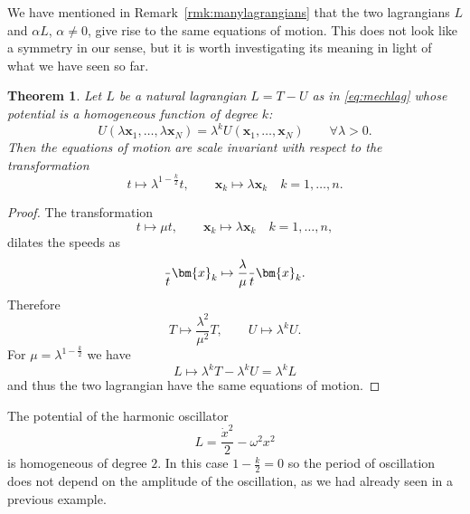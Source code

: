 \documentclass[english,fontsize=11pt,paper=a5,oneside]{scrbook}
\newcommand{\bx}{\bm{x}}
\let\d\relax
\DeclareMathOperator{\d}{d}
\newtheorem{theorem}{Theorem}[chapter]
\theoremstyle{definition}
\newenvironment{example}
  {\pushQED{\qed}\renewcommand{\qedsymbol}{$\lozenge$}\examplex}
  {\popQED\endexamplex}
\begin{document}
We have mentioned in Remark~\ref{rmk:manylagrangians} that the two lagrangians $L$ and $\alpha L$, $\alpha\neq0$, give rise to the same equations of motion.
This does not look like a symmetry in our sense, but it is worth investigating its meaning in light of what we have seen so far.

\begin{theorem}
    Let $L$ be a natural lagrangian $L=T-U$ as in \eqref{eq:mechlag} whose potential is a homogeneous function of degree $k$:
    \begin{equation}
        U(\lambda\bx_1, \ldots, \lambda\bx_N) = \lambda^k U(\bx_1, \ldots, \bx_N)
        \qquad\forall \lambda>0.
    \end{equation}
    Then the equations of motion are scale invariant with respect to the transformation
    \begin{equation}
        t \mapsto \lambda^{1-\frac{k}2} t, \qquad
        \bx_k \mapsto \lambda\bx_k \quad k=1,\ldots,n.
    \end{equation}
\end{theorem}
\begin{proof}
    The transformation
    \begin{equation}
        t \mapsto \mu t, \qquad
        \bx_k \mapsto \lambda\bx_k \quad k=1,\ldots,n,
    \end{equation}
    dilates the speeds as
    \begin{equation}
        \frac{\d}{\d t} \bx_k \mapsto \frac{\lambda}{\mu} \frac{\d}{\d t}\bx_k.
    \end{equation}
    Therefore
    \begin{equation}
        T \mapsto \frac{\lambda^2}{\mu^2} T, \qquad U \mapsto \lambda^k U.
    \end{equation}
    For $\mu = \lambda^{1-\frac{k}2}$ we have
    \begin{equation}
        L \mapsto \lambda^k T - \lambda^k U = \lambda^k L
    \end{equation}
    and thus the two lagrangian have the same equations of motion.
\end{proof}

\begin{example}[Harmonic oscillator]
    The potential of the harmonic oscillator
    \begin{equation}
        L = \frac{\dot x^2}2 - \omega^2 x^2
    \end{equation}
    is homogeneous of degree $2$. In this case $1-\frac k2 = 0$ so the period of oscillation does not depend on the amplitude of the oscillation, as we had already seen in a previous example.
\end{example}
\end{document}
